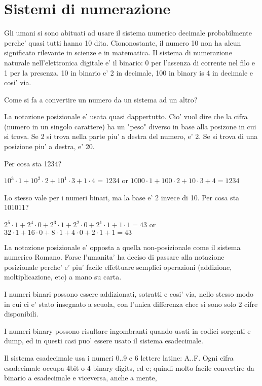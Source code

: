 \section{Sistemi di numerazione}

Gli umani si sono abituati ad usare il sistema numerico decimale probabilmente perche' quasi tutti hanno 10 dita.
Ciononostante, il numero 10 non ha alcun significato rilevante in scienze e in matematica.
Il sistema di numerazione naturale nell'elettronica digitale e' il binario: 0 per l'assenza di corrente nel filo e 1 per la presenza.
10 in binario e' 2 in decimale, 100 in binary is 4 in decimale e cosi' via.

Come si fa a convertire un numero da un sistema ad un altro?

La notazione posizionale e' usata quasi dappertutto. Cio' vuol dire che la cifra (numero in un singolo carattere) ha un "peso" diverso in base alla posizone in cui si trova. 
Se 2 si trova nella parte piu' a destra del numero, e' 2.
Se si trova di una posizione piu' a destra, e' 20.

Per cosa sta 1234?

$10^3 \cdot 1 + 10^2 \cdot 2 + 10^1 \cdot 3 + 1 \cdot 4$ = 1234 or 
$1000 \cdot 1 + 100 \cdot 2 + 10 \cdot 3 + 4 = 1234$

Lo stesso vale per i numeri binari, ma la base e' 2 invece di 10.
Per cosa sta 101011?

$2^5 \cdot 1 + 2^4 \cdot 0 + 2^3 \cdot 1 + 2^2 \cdot 0 + 2^1 \cdot 1 + 1 \cdot 1 = 43$ or
$32 \cdot 1 + 16 \cdot 0 + 8 \cdot 1 + 4 \cdot 0 + 2 \cdot 1 + 1 = 43$

La notazione posizionale e' opposta a quella non-posizionale come il sistema numerico Romano.
Forse l'umanita' ha deciso di passare alla notazione posizionale perche' e' piu' facile effettuare semplici operazioni (addizione, moltiplicazione, etc) a mano su carta.

I numeri binari possono essere addizionati, sotratti e cosi' via, nello stesso modo in cui ci e' stato insegnato a scuola, con l'unica differenza chec si sono solo 2 cifre disponibili.

I numeri binary possono risultare ingombranti quando usati in codici sorgenti e dump, ed in questi casi puo' essere usato il sistema esadecimale.

Il sistema esadecimale usa i numeri 0..9 e 6 lettere latine: A..F.
Ogni cifra esadecimale occupa 4bit o 4 binary digits, ed e; quindi molto facile convertire da binario a esadecimale e viceversa, anche a mente,

